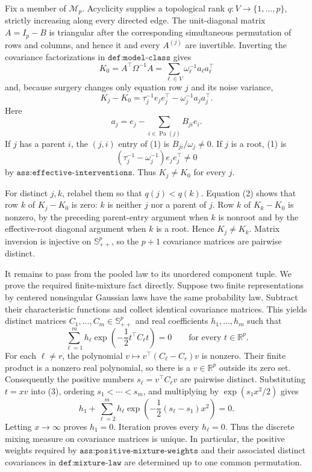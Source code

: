 Fix a member of \(\mathcal M_p\).  Acyclicity supplies a topological rank
\(q:V\to\{1,\ldots,p\}\), strictly increasing along every directed edge.
The unit-diagonal matrix \(A=I_p-B\) is triangular after the corresponding
simultaneous permutation of rows and columns, and hence it and every
\(A^{(j)}\) are invertible.  Inverting the covariance factorizations in
\(\texttt{def:model-class}\) gives
\[
 K_0=A^{\top}\Omega^{-1}A
     =\sum_{\ell\in V}\omega_\ell^{-1}a_\ell a_\ell^{\top}
\]
and, because surgery changes only equation row \(j\) and its noise variance,
\[
 K_j-K_0
 =\tau_j^{-1}e_je_j^{\top}
  -\omega_j^{-1}a_ja_j^{\top}.                                      \tag{1}
\]
Here
\[
 a_j=e_j-\sum_{i\in\operatorname{Pa}(j)}B_{ji}e_i.                   \tag{2}
\]
If \(j\) has a parent \(i\), the \((j,i)\) entry of (1) is
\(B_{ji}/\omega_j\neq0\).  If \(j\) is a root, (1) is
\[
 (\tau_j^{-1}-\omega_j^{-1})e_je_j^{\top}\neq0
\]
by \(\texttt{ass:effective-interventions}\).  Thus \(K_j\neq K_0\) for
every \(j\).

For distinct \(j,k\), relabel them so that \(q(j)<q(k)\).  Equation (2)
shows that row \(k\) of \(K_j-K_0\) is zero: \(k\) is neither \(j\) nor a
parent of \(j\).  Row \(k\) of \(K_k-K_0\) is nonzero, by the preceding
parent-entry argument when \(k\) is nonroot and by the effective-root
diagonal argument when \(k\) is a root.  Hence \(K_j\neq K_k\).  Matrix
inversion is injective on \(\mathbb S_{++}^p\), so the \(p+1\) covariance
matrices are pairwise distinct.

It remains to pass from the pooled law to its unordered component tuple.
We prove the required finite-mixture fact directly.  Suppose two finite
representations by centered nonsingular Gaussian laws have the same
probability law.  Subtract their characteristic functions and collect
identical covariance matrices.  This yields distinct matrices
\(C_1,\ldots,C_m\in\mathbb S_{++}^p\) and real coefficients
\(h_1,\ldots,h_m\) such that
\[
 \sum_{\ell=1}^m h_\ell
 \exp\!\left(-\frac12 t^{\top}C_\ell t\right)=0
 \qquad\text{for every }t\in\mathbb R^p.                            \tag{3}
\]
For each \(\ell\neq r\), the polynomial
\(v\mapsto v^{\top}(C_\ell-C_r)v\) is nonzero.  Their finite product is a
nonzero real polynomial, so there is a \(v\in\mathbb R^p\) outside its
zero set.  Consequently the positive numbers
\(s_\ell=v^{\top}C_\ell v\) are pairwise distinct.  Substituting
\(t=xv\) into (3), ordering \(s_1<\cdots<s_m\), and multiplying by
\(\exp(s_1x^2/2)\) gives
\[
 h_1+\sum_{\ell=2}^m h_\ell
       \exp\!\left(-\frac12(s_\ell-s_1)x^2\right)=0 .
\]
Letting \(x\to\infty\) proves \(h_1=0\).  Iteration proves every
\(h_\ell=0\).  Thus the discrete mixing measure on covariance matrices is
unique.  In particular, the positive weights required by
\(\texttt{ass:positive-mixture-weights}\) and their associated distinct
covariances in \(\texttt{def:mixture-law}\) are determined up to one common
permutation.

